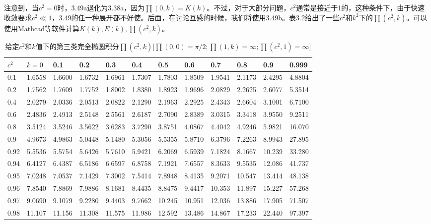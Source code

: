 注意到，当$c^2=0$时，3.49a退化为3.38a，因为$\prod(0,k)=K(k)$。不过，对于大部分问题，$c^2$通常是接近于1的，这种条件下，由于快速收敛要求$c^2\ll 1$，3.49的任一种展开都不好使。后面，在讨论互感的时候，我们将使用3.49b。表3.2给出了一些$c^2$和$k^2$下的$\prod(c^2,k)$。可以使用Mathcad等软件计算$K(k),E(k),\prod(c^2,k)$。

\begin{table}[htbp]%
	  \centering
	\caption{给定$c^2$和$k$值下的第三类完全椭圆积分$\prod(c^2,k)$[$\prod(0,0)=\pi/2;\prod(1,k)=\infty;\prod(c^2,1)=\infty$]}
	\begin{tabular}{|l||l|l|l|l|l|l|l|l|l|l|l|}
		\hline
		$c^2$ & $k=0$    & 0.1    & 0.2    & 0.3    & 0.4    & 0.5    & 0.6    & 0.7    & 0.8    & 0.9    & 0.999  \\ \hline\hline
		0.1   & 1.6558 & 1.6600 & 1.6732 & 1.6961 & 1.7307 & 1.7803 & 1.8509 & 1.9541 & 2.1173 & 2.4295 & 4.8804 \\ 
		0.2   & 1.7562 & 1.7609 & 1.7752 & 1.8002 & 1.8380 & 1.8923 & 1.9696 & 2.0829 & 2.2625 & 2.6077 & 5.3514 \\ 
		0.4   & 2.0279 & 2.0336 & 2.0513 & 2.0822 & 2.1290 & 2.1963 & 2.2925 & 2.4343 & 2.6604 & 3.1001 & 6.7100 \\ 
		0.6   & 2.4836 & 2.4913 & 2.5148 & 2.5561 & 2.6187 & 2.7090 & 2.8389 & 3.0315 & 3.3418 & 3.9550 & 9.2511 \\ 
		0.8   & 3.5124 & 3.5246 & 3.5622 & 3.6283 & 3.7290 & 3.8751 & 4.0867 & 4.4042 & 4.9246 & 5.9821 & 16.070 \\ 
		0.9   & 4.9673 & 4.9863 & 5.0448 & 5.1480 & 5.3056 & 5.5355 & 5.8710 & 6.3796 & 7.2263 & 8.9943 & 27.895 \\ 
		0.92  & 5.5536 & 5.5754 & 5.6426 & 5.7610 & 5.9421 & 6.2069 & 6.5939 & 7.1824 & 8.1667 & 10.239 & 33.280 \\ 
		0.94  & 6.4127 & 6.4387 & 6.5186 & 6.6597 & 6.8758 & 7.1921 & 7.6557 & 8.3633 & 9.5535 & 12.086 & 41.737 \\ 
		0.95  & 7.0248 & 7.0537 & 7.1429 & 7.3002 & 7.5414 & 7.8948 & 8.4135 & 9.2071 & 10.547 & 13.414 & 48.138 \\ 
		0.96  & 7.8540 & 7.8869 & 7.9886 & 8.1681 & 8.4435 & 8.8475 & 9.4417 & 10.353 & 11.897 & 15.227 & 57.268 \\ 
		0.97  & 9.0690 & 9.1079 & 9.2280 & 9.4403 & 9.7662 & 10.245 & 10.951 & 12.036 & 13.886 & 17.905 & 71.507 \\ 
		0.98  & 11.107 & 11.156 & 11.308 & 11.575 & 11.986 & 12.592 & 13.486 & 14.867 & 17.233 & 22.440 & 97.397 \\ 

\end{tabular}
\end{table}
